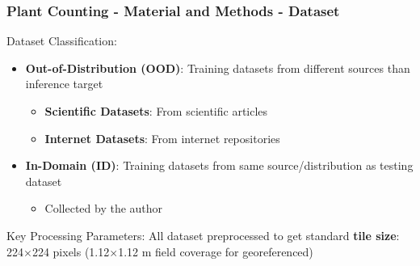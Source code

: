\documentclass[aspectratio=43]{beamer}
\begin{document}
\begin{frame}
    \frametitle{\small Plant Counting - Material and Methods - Dataset}
    
    \begin{block}{Dataset Classification:}
        \small
        \begin{itemize}
            \item \textbf{Out-of-Distribution (OOD)}: Training datasets from different sources than inference target
                \begin{itemize}
                    \item \textbf{Scientific Datasets}: From scientific articles
                    \item \textbf{Internet Datasets}: From internet repositories
                \end{itemize}
            \item \textbf{In-Domain (ID)}: Training datasets from same source/distribution as testing dataset
                \begin{itemize}
                    \item Collected by the author
                \end{itemize}
        \end{itemize}
    \end{block}
            
    \begin{exampleblock}{Key Processing Parameters:}
            All dataset preprocessed to get standard \textbf{tile size}: 224\ensuremath{\times}224 pixels (1.12\ensuremath{\times}1.12 m field coverage for georeferenced)
    \end{exampleblock}

\end{frame}
\end{document}
